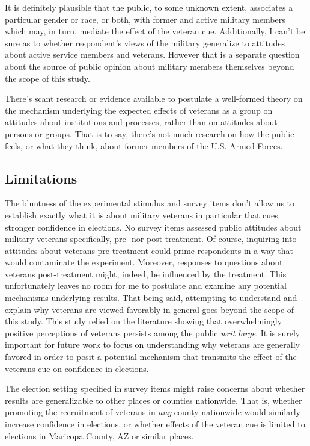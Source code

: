 \documentclass[
  12pt,
  letterpaper,
]{article}
\begin{document}
It is definitely plausible that the public, to some unknown extent,
associates a particular gender or race, or both, with former and active
military members which may, in turn, mediate the effect of the veteran
cue. Additionally, I can't be sure as to whether respondent's views of
the military generalize to attitudes about active service members and
veterans. However that is a separate question about the source of public
opinion about military members themselves beyond the scope of this
study.

There's scant research or evidence available to postulate a well-formed
theory on the mechanism underlying the expected effects of veterans as a
group on attitudes about institutions and processes, rather than on
attitudes about persons or groups. That is to say, there's not much
research on how the public feels, or what they think, about former
members of the U.S. Armed Forces.

\subsection{Limitations}\label{limitations}

The bluntness of the experimental stimulus and survey items don't allow
us to establish exactly what it is about military veterans in particular
that cues stronger confidence in elections. No survey items assessed
public attitudes about military veterans specifically, pre- nor
post-treatment. Of course, inquiring into attitudes about veterans
pre-treatment could prime respondents in a way that would contaminate
the experiment. Moreover, responses to questions about veterans
post-treatment might, indeed, be influenced by the treatment. This
unfortunately leaves no room for me to postulate and examine any
potential mechanisms underlying results. That being said, attempting to
understand and explain why veterans are viewed favorably in general goes
beyond the scope of this study. This study relied on the literature
showing that overwhelmingly positive perceptions of veterans persists
among the public \emph{writ large}. It is surely important for future
work to focus on understanding why veterans are generally favored in
order to posit a potential mechanism that transmits the effect of the
veterans cue on confidence in elections.

The election setting specified in survey items might raise concerns
about whether results are generalizable to other places or counties
nationwide. That is, whether promoting the recruitment of veterans in
\emph{any} county nationwide would similarly increase confidence in
elections, or whether effects of the veteran cue is limited to elections
in Maricopa County, AZ or similar places.
\end{document}
